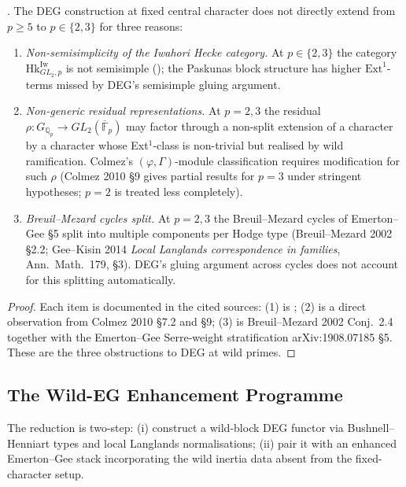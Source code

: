 \begin{proposition}
\label{v4-arith:deg-f1a:prop:DEG-wild-obs}
\ClaimStatusProvedHere. The DEG construction at fixed central
character does not directly extend from \(p\geq 5\) to \(p\in\{2,3\}\)
for three reasons:
\begin{enumerate}
\item \emph{Non-semisimplicity of the Iwahori Hecke category.} At
\(p\in\{2,3\}\) the category \(\mathrm{Hk}^{\mathrm{Iw}}_{GL_{2},p}\)
is not semisimple
(); the Paskunas
block structure has higher \(\mathrm{Ext}^{1}\)-terms missed by DEG's
semisimple gluing argument.
\item \emph{Non-generic residual representations.} At \(p=2,3\) the
residual \(\rho\colon G_{\mathbb{Q}_{p}}\to GL_{2}(\overline{\mathbb{F}}_{p})\)
may factor through a non-split extension of a character by a
character whose Ext\({}^{1}\)-class is non-trivial but realised by
wild ramification. Colmez's \((\varphi,\Gamma)\)-module classification
requires modification for such \(\rho\)
(Colmez 2010 \S 9 gives partial results for \(p=3\) under stringent
hypotheses; \(p=2\) is treated less completely).
\item \emph{Breuil--Mezard cycles split.} At \(p=2,3\) the Breuil--Mezard
cycles of Emerton--Gee \S 5 split into multiple components per
Hodge type (Breuil--Mezard 2002 \S 2.2; Gee--Kisin 2014 \emph{Local
Langlands correspondence in families}, Ann.~Math.~179, \S 3). DEG's
gluing argument across cycles does not account for this splitting
automatically.
\end{enumerate}
\end{proposition}

\begin{proof}
Each item is documented in the cited sources: (1) is
; (2) is a direct
observation from Colmez 2010 \S 7.2 and \S 9; (3) is
Breuil--Mezard 2002 Conj.~2.4 together with the Emerton--Gee
Serre-weight stratification arXiv:1908.07185 \S 5. These are the
three obstructions to DEG at wild primes.
\end{proof}

\subsection{The Wild-EG Enhancement Programme}

The reduction is two-step: (i) construct a wild-block DEG functor
via Bushnell--Henniart types and local Langlands normalisations;
(ii) pair it with an enhanced Emerton--Gee stack incorporating the
wild inertia data absent from the fixed-character setup.

